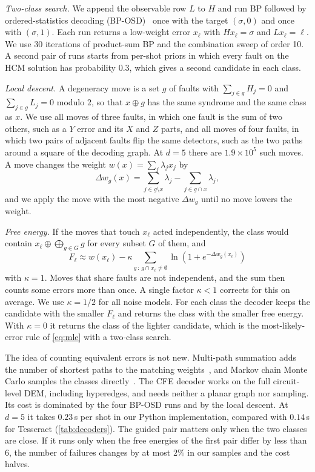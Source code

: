 \emph{Two-class search.} We append the observable row $L$ to $H$ and run BP followed by ordered-statistics decoding (BP-OSD)~\cite{panteleev2021,roffe2020} once with the target $(\sigma,0)$ and once with $(\sigma,1)$. Each run returns a low-weight error $x_\ell$ with $Hx_\ell=\sigma$ and $Lx_\ell=\ell$. We use 30 iterations of product-sum BP and the combination sweep of order 10. A second pair of runs starts from per-shot priors in which every fault on the HCM solution has probability $0.3$, which gives a second candidate in each class.

\emph{Local descent.} A degeneracy move is a set $g$ of faults with $\sum_{j\in g}H_j=0$ and $\sum_{j\in g}L_j=0$ modulo 2, so that $x\oplus g$ has the same syndrome and the same class as $x$. We use all moves of three faults, in which one fault is the sum of two others, such as a $Y$ error and its $X$ and $Z$ parts, and all moves of four faults, in which two pairs of adjacent faults flip the same detectors, such as the two paths around a square of the decoding graph. At $d=5$ there are $1.9\times10^{5}$ such moves. A move changes the weight $w(x)=\sum_j\lambda_jx_j$ by
\begin{equation}
  \Delta w_g(x)=\sum_{j\in g\setminus x}\lambda_j-\sum_{j\in g\cap x}\lambda_j ,
  \label{eq:dw}
\end{equation}
and we apply the move with the most negative $\Delta w_g$ until no move lowers the weight.

\emph{Free energy.} If the moves that touch $x_\ell$ acted independently, the class would contain $x_\ell\oplus\bigoplus_{g\in G}g$ for every subset $G$ of them, and
\begin{equation}
  F_\ell\approx w(x_\ell)-\kappa\sum_{g\,:\,g\cap x_\ell\neq\emptyset}\ln\!\left(1+e^{-\Delta w_g(x_\ell)}\right)
  \label{eq:cfe}
\end{equation}
with $\kappa=1$. Moves that share faults are not independent, and the sum then counts some errors more than once. A single factor $\kappa<1$ corrects for this on average. We use $\kappa=1/2$ for all noise models. For each class the decoder keeps the candidate with the smaller $F_\ell$ and returns the class with the smaller free energy. With $\kappa=0$ it returns the class of the lighter candidate, which is the most-likely-error rule of \autoref{eq:mle} with a two-class search.

The idea of counting equivalent errors is not new. Multi-path summation adds the number of shortest paths to the matching weights~\cite{criger2018}, and Markov chain Monte Carlo samples the classes directly~\cite{hutter2014}. The CFE decoder works on the full circuit-level DEM, including hyperedges, and needs neither a planar graph nor sampling. Its cost is dominated by the four BP-OSD runs and by the local descent. At $d=5$ it takes $0.23$\,s per shot in our Python implementation, compared with $0.14$\,s for Tesseract (\autoref{tab:decoders}). The guided pair matters only when the two classes are close. If it runs only when the free energies of the first pair differ by less than 6, the number of failures changes by at most $2\%$ in our samples and the cost halves.

